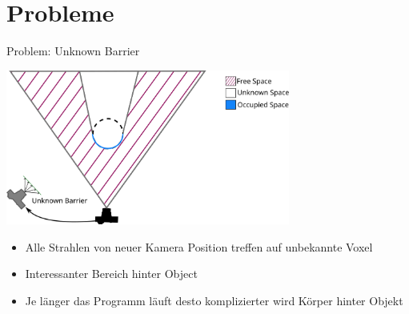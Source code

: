 \documentclass{beamer}
\begin{document}
\section{Probleme}
\begin{frame}{Problem: Unknown Barrier}
	\begin{block}{}
		\begin{center}
			\includegraphics[width=0.7\textwidth]{Graphics/unknown_barrier_v2.png}
		\end{center}
		\begin{itemize}
			\item Alle Strahlen von neuer Kamera Position treffen auf unbekannte Voxel
			\item Interessanter Bereich hinter Object
			\item Je länger das Programm läuft desto komplizierter wird Körper hinter Objekt
		\end{itemize}
	\end{block}
\end{frame}

\printbibliography
\end{document}
